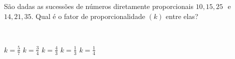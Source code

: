 \parbox{\linewidth}{

São dadas as sucessões de números diretamente proporcionais $10, 15, 25$\, \,e\, \,$14, 21,35$. Qual é o fator de proporcionalidade $(k)$ entre elas?}\vspace{2mm}\\\parbox{\linewidth}{

$k=\frac{5}{7}$
$k=\frac{3}{4}$
$k=\frac{4}{3}$
$k=\frac{1}{3}$
$k=\frac{1}{4}$

}

